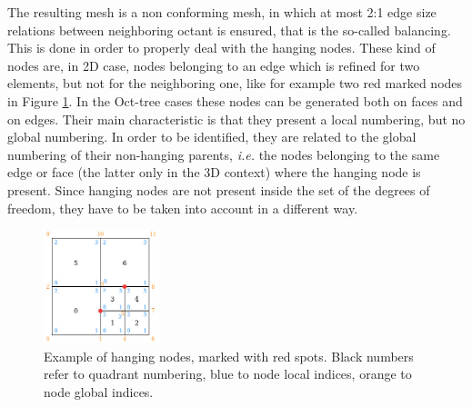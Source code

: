 \documentclass[11pt,a4paper]{article}
\begin{document}
The resulting mesh is a non conforming mesh, in which at most 2:1 edge size relations between neighboring octant is ensured, that is the so-called balancing. This is done in order to properly deal with the hanging nodes. These kind of nodes are, in 2D case, nodes belonging to an edge which is refined for two elements, but not for the neighboring one, like for example two red marked nodes in Figure \ref{fig:hanging}. In the Oct-tree cases these nodes can be generated both on faces and on edges. Their main characteristic is that they present a local numbering, but no global numbering. In order to be identified, they are related to the global numbering of their non-hanging parents, \emph{i.e.} the nodes belonging to the same edge or face (the latter only in the 3D context) where the hanging node is present. Since hanging nodes are not present inside the set of the degrees of freedom, they have to be taken into account in a different way. 

\begin{figure}[H]
    \centering
    \includegraphics[width=0.3\textwidth]{Images/hanging.jpg}
    \caption{Example of hanging nodes, marked with red spots. Black numbers refer to quadrant numbering, blue to node local indices, orange to node global indices.}
    \label{fig:hanging}
\end{figure}
\end{document}
